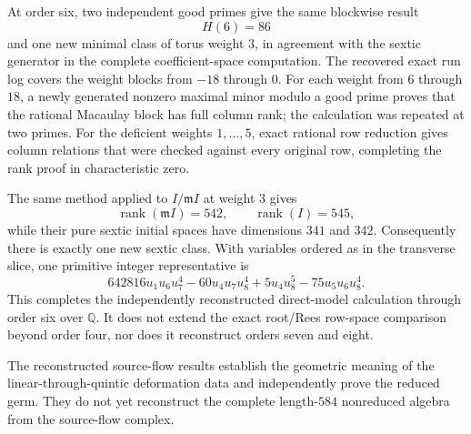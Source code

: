 At order six, two independent good primes give the same blockwise result
\[
H(6)=86
\]
and one new minimal class of torus weight \(3\), in agreement with the
sextic generator in the complete coefficient-space computation.  The
recovered exact run log covers the weight blocks from \(-18\) through \(0\).
For each weight from \(6\) through \(18\), a newly generated nonzero maximal
minor modulo a good prime proves that the rational Macaulay block has full
column rank; the calculation was repeated at two primes.  For the deficient
weights \(1,\ldots,5\), exact rational row reduction gives column relations
that were checked against every original row, completing the rank proof in
characteristic zero.

The same method applied to \(I/\mathfrak mI\) at weight \(3\) gives
\[
\operatorname{rank}(\mathfrak mI)=542,\qquad
\operatorname{rank}(I)=545,
\]
while their pure sextic initial spaces have dimensions \(341\) and \(342\).
Consequently there is exactly one new sextic class.  With variables ordered
as in the transverse slice, one primitive integer representative is
\[
642816u_1u_6u_7^4-60u_4u_7u_8^4+5u_4u_8^5
-75u_5u_6u_8^4.
\]
This completes the independently reconstructed direct-model calculation
through order six over \(\mathbb Q\).  It does not extend the exact
root/Rees row-space comparison beyond order four, nor does it reconstruct
orders seven and eight.

The reconstructed source-flow results establish the geometric meaning of
the linear-through-quintic deformation data and independently prove the
reduced germ.  They do not yet reconstruct the complete length-\(584\)
nonreduced algebra from the source-flow complex.
